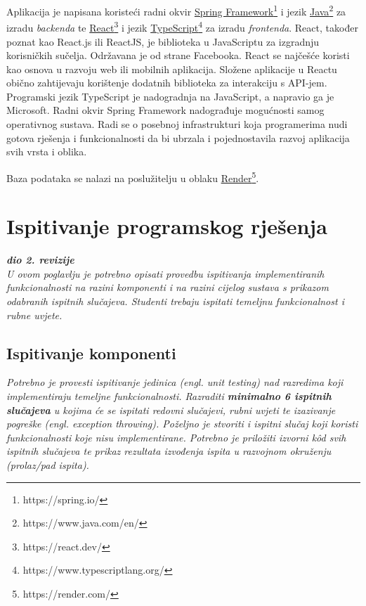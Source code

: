 			 Aplikacija je napisana koristeći radni okvir \underline{Spring Framework}\footnote{https://spring.io/} i jezik \underline{Java}\footnote{https://www.java.com/en/} za izradu \textit{backenda} te \underline{React}\footnote{https://react.dev/} i jezik \underline{TypeScript}\footnote{https://www.typescriptlang.org/} za izradu \textit{frontenda}. React, također poznat kao React.js ili ReactJS, je biblioteka u JavaScriptu za izgradnju korisničkih sučelja. Održavana je od strane Facebooka. React se najčešće koristi kao osnova u razvoju web ili mobilnih aplikacija. Složene aplikacije u Reactu obično zahtijevaju korištenje dodatnih biblioteka za interakciju s API-jem. Programski jezik TypeScript je nadogradnja na JavaScript, a napravio ga je Microsoft. Radni okvir Spring Framework nadograđuje mogućnosti samog operativnog sustava. Radi se o posebnoj infrastrukturi koja programerima nudi gotova rješenja i funkcionalnosti da bi ubrzala i pojednostavila razvoj aplikacija svih vrsta i oblika.
			 
			 Baza podataka se nalazi na poslužitelju u oblaku \underline{Render}\footnote{https://render.com/}.	
			
			\eject
		
	
		\section{Ispitivanje programskog rješenja}
			
			\textbf{\textit{dio 2. revizije}}\\
			
			 \textit{U ovom poglavlju je potrebno opisati provedbu ispitivanja implementiranih funkcionalnosti na razini komponenti i na razini cijelog sustava s prikazom odabranih ispitnih slučajeva. Studenti trebaju ispitati temeljnu funkcionalnost i rubne uvjete.}
	
			
			\subsection{Ispitivanje komponenti}
			\textit{Potrebno je provesti ispitivanje jedinica (engl. unit testing) nad razredima koji implementiraju temeljne funkcionalnosti. Razraditi \textbf{minimalno 6 ispitnih slučajeva} u kojima će se ispitati redovni slučajevi, rubni uvjeti te izazivanje pogreške (engl. exception throwing). Poželjno je stvoriti i ispitni slučaj koji koristi funkcionalnosti koje nisu implementirane. Potrebno je priložiti izvorni kôd svih ispitnih slučajeva te prikaz rezultata izvođenja ispita u razvojnom okruženju (prolaz/pad ispita). }
			
